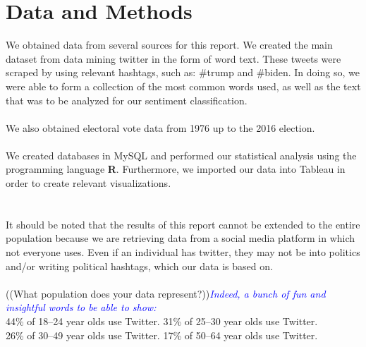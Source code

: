 \documentclass[11pt, oneside]{article}
\begin{document}
\section{Data and Methods}
We obtained data from several sources for this report. We created the main dataset from data mining twitter in the form of word text. These tweets were scraped by using relevant hashtags, such as: \#trump and \#biden. In doing so, we were able to form a collection of the most common words used, as well as the text that was to be analyzed for our sentiment classification.\\
\\
We also obtained electoral vote data from 1976 up to the 2016 election.\\
\\
We created databases in MySQL and performed our statistical analysis using the programming language \textbf\textsf{R}. Furthermore, we imported our data into Tableau in order to create relevant visualizations.\\
\\
\\
It should be noted that the results of this report cannot be extended to the entire population because we are retrieving data from a social media platform in which not everyone uses. Even if an individual has twitter, they may not be into politics and/or writing political hashtags, which our data is based on.\\
\\
((What population does your data represent?))\textcolor{blue}{\emph{Indeed, a bunch of fun and insightful words to be able to show:}}\\
44\% of 18–24 year olds use Twitter. 31\% of 25–30 year olds use Twitter.\\
26\% of 30–49 year olds use Twitter. 17\% of 50–64 year olds use Twitter.\\

\end{document}
